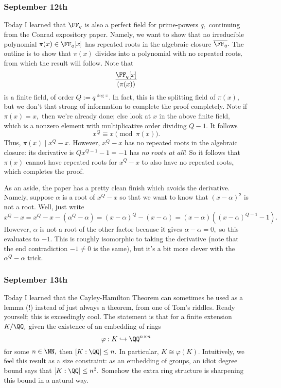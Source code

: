 \subsubsection{September 12th}
Today I learned that $\FF_q$ is also a perfect field for prime-powers $q,$ continuing from the Conrad expository paper. Namely, we want to show that no irreducible polynomial $\pi(x)\in\FF_q[x]$ has repeated roots in the algebraic closure $\overline{\FF_q}.$ The outline is to show that $\pi(x)$ divides into a polynomial with no repeated roots, from which the result will follow. Note that
\[\frac{\FF_q[x]}{(\pi(x))}\]
is a finite field, of order $Q:=q^{\deg\pi}.$ In fact, this is the splitting field of $\pi(x),$ but we don't that strong of information to complete the proof completely. Note if $\pi(x)=x,$ then we're already done; else look at $x$ in the above finite field, which is a nonzero element with multiplicative order dividing $Q-1.$ It follows
\[x^Q\equiv x\pmod{\pi(x)}.\]
Thus, $\pi(x)\mid x^Q-x.$ However, $x^Q-x$ has no repeated roots in the algebraic closure: its derivative is $Qx^{Q-1}-1=-1$ has $\textit{no roots at all!}$ So it follows that $\pi(x)$ cannot have repeated roots for $x^Q-x$ to also have no repeated roots, which completes the proof.

As an aside, the paper has a pretty clean finish which avoids the derivative. Namely, suppose $\alpha$ is a root of $x^Q-x$ so that we want to know that $(x-\alpha)^2$ is not a root. Well, just write
\[x^Q-x=x^Q-x-\left(\alpha^Q-\alpha\right)=(x-\alpha)^Q-(x-\alpha)=(x-\alpha)\left((x-\alpha)^{Q-1}-1\right).\]
However, $\alpha$ is not a root of the other factor because it gives $\alpha-\alpha=0,$ so this evaluates to $-1.$ This is roughly isomorphic to taking the derivative (note that the end contradiction $-1\ne0$ is the same), but it's a bit more clever with the $\alpha^Q-\alpha$ trick.

\subsubsection{September 13th}
Today I learned that the Cayley-Hamilton Theorem can sometimes be used as a lemma (!) instead of just always a theorem, from one of Tom's riddles. Ready yourself; this is exceedingly cool. The statement is that for a finite extension $K/\QQ,$ given the existence of an embedding of rings
\[\varphi:K\hookrightarrow\QQ^{n\times n}\]
for some $n\in\NN,$ then $[K:\QQ]\le n.$ In particular, $K\cong\varphi(K).$ Intuitively, we feel this result as a size constraint: as an embedding of groups, an idiot degree bound says that $[K:\QQ]\le n^2.$ Somehow the extra ring structure is sharpening this bound in a natural way.

